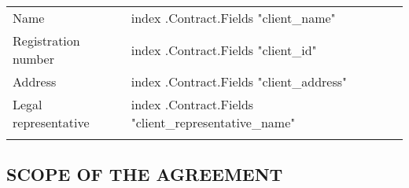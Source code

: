 \documentclass[a4paper]{article}
\begin{document}
\begin{tabu}{|X|X[2]|} \tabucline{}
  Name                   &{{index .Contract.Fields "client_name"}}                 \\\tabucline{}
  Registration number    &{{index .Contract.Fields "client_id"}}                   \\\tabucline{}
  Address                &{{index .Contract.Fields "client_address"}}              \\\tabucline{}
  Legal representative   &{{index .Contract.Fields "client_representative_name"}}  \\\tabucline{}
\end{tabu}

\vspace{5mm}

\subsection{SCOPE OF THE AGREEMENT}

\vspace{2mm}
\end{document}

